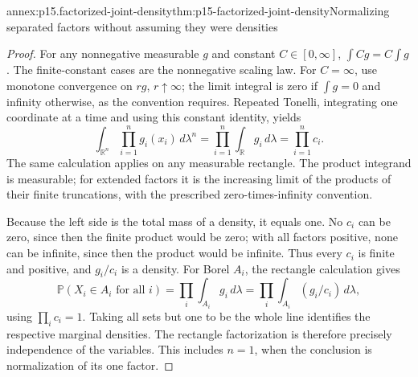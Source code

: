 \begin{annexitem}{annex:p15.factorized-joint-density}{thm:p15-factorized-joint-density}{Normalizing separated factors without assuming they were densities}
\begin{proof}
For any nonnegative measurable \(g\) and constant \(C\in[0,\infty]\),
\(\int Cg=C\int g\). The finite-constant cases are the
nonnegative scaling law. For \(C=\infty\), use monotone
convergence on \(r g\), \(r\uparrow\infty\); the limit
integral is zero if \(\int g=0\) and infinity otherwise,
as the convention requires. Repeated Tonelli, integrating one
coordinate at a time and using this constant identity, yields
\[
 \int_{\mathbb R^n}\prod_{i=1}^n g_i(x_i)\,d\lambda^n
                     =\prod_{i=1}^n\int_{\mathbb R}g_i\,d\lambda
                     =\prod_{i=1}^n c_i.
\]
The same calculation applies on any measurable rectangle. The
product integrand is measurable; for extended factors it is the
increasing limit of the products of their finite truncations,
with the prescribed zero-times-infinity convention.

Because the left side is the total mass of a density, it equals
one. No \(c_i\) can be zero, since then the finite product
would be zero; with all factors positive, none can be infinite,
since then the product would be infinite. Thus every \(c_i\)
is finite and positive, and \(g_i/c_i\) is a density.
For Borel \(A_i\), the rectangle calculation gives
\[
 \mathbb P(X_i\in A_i\text{ for all }i)
   =\prod_i\int_{A_i}g_i\,d\lambda
   =\prod_i\int_{A_i}(g_i/c_i)\,d\lambda,
\]
using \(\prod_i c_i=1\). Taking all sets but one to be the
whole line identifies the respective marginal densities. The
rectangle factorization is therefore precisely independence of
the variables. This includes \(n=1\), when the conclusion is
normalization of its one factor.
\end{proof}
\end{annexitem}

